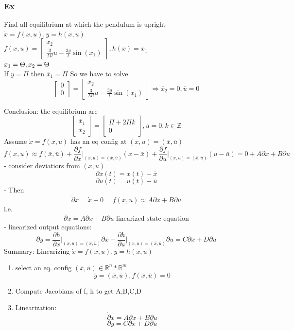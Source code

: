 \documentclass[letterpaper]{article}
\begin{document}
\subsubsection*{\underline{Ex}}
Find all equilibrium at which the pendulum is upright\\
$\dot x=f(x,u),y=h(x,u)$\\
$f(x,u)=\begin{bmatrix}x_2\\\frac{3}{Ml}u-\frac{3g}{l}\sin(x_1)\end{bmatrix},h(x)=x_1$\\
$x_1=\Theta, x_2=\dot\\ \Theta$\\
If $y=\Pi$ then $\bar x_1=\Pi$ So we have to solve $$\begin{bmatrix}0\\0\end{bmatrix}=\begin{bmatrix}x_2\\\frac{3}{Ml}u-\frac{3g}{l}\sin(x_1)\end{bmatrix}\Rightarrow \bar x_2=0, \bar u=0$$
  
Conclusion: the equilibrium are $$\begin{bmatrix}\bar x_1\\\bar x_2\end{bmatrix}=\begin{bmatrix}\Pi+2\Pi k\\0\end{bmatrix}, \bar u=0, k\in \mathbb{Z}$$
Assume $\dot x=f(x,u)$ has an eq config at $(x,u)=(\bar x, \bar u)$
$$f(x,u)\approx f(\bar x,\bar u)+\frac{\partial f}{\partial x}\vert_{(x,u)=(\bar x,\bar u)}(x-\bar x)+\frac{\partial f}{\partial u}\vert_{(x,u)=(\bar x,\bar u)}(u-\bar u)=0+A\partial x + B \partial u$$
- consider deviatiors from $(\bar x,\bar u)$ $$\partial x(t)=x(t)-\bar x$$ $$\partial u(t)=u(t)-\bar u$$
- Then $$\dot \partial x=\dot x -0=f(x,u)\approx A\partial x + B \partial u$$
i.e. \begin{equation}
\dot \partial x=A\partial x+B\partial u \text{ linearized state equation}
\end{equation}
- linearized output equations: $$\partial y=\frac{\partial h}{\partial x}\vert_{(x,u)=(\bar x,\bar u)}\partial x+\frac{\partial h}{\partial u}\vert_{(x,u)=(\bar x,\bar u)}\partial u=C\partial x+D\partial u$$
Summary: Linearizing $\dot x=f(x,u), y=h(x,u)$
\begin{enumerate}
  \item select an eq. config $(\bar x,\bar u)\in \mathbb{R}^n*\mathbb{R}^m$ $$\bar y=(\bar x,\bar u), f(\bar x,\bar u)=0$$
  \item Compute Jacobians of f, h to get A,B,C,D
  \item Linearization: $$\dot \partial x=A\partial x+B\partial u$$ $$\partial y=C\partial x+D\partial u$$
\end{enumerate}
    
\end{document}
